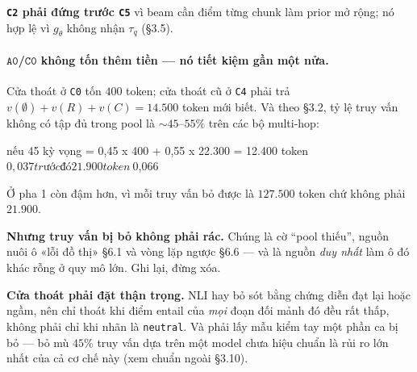 \documentclass[11pt,a4paper]{article}
\begin{document}

\textbf{\texttt{C2} phải đứng trước \texttt{C5}} vì beam cần điểm từng chunk làm prior mở
rộng; nó hợp lệ vì $g_\theta$ không nhận $\tau_q$ (\S3.5).

\paragraph{$\mathtt{A0}$/$\mathtt{C0}$ không tốn thêm tiền --- nó tiết kiệm gần một nửa.} Cửa
thoát ở \texttt{C0} tốn $400$ token; cửa thoát cũ ở \texttt{C4} phải trả
$v(\emptyset)+v(R)+v(C)=14.500$ token mới biết. Và theo \S3.2, tỷ lệ truy vấn không có tập đủ
trong pool là ${\sim}45$--$55\%$ trên các bộ multi-hop:

\begin{dia}
nếu 45%
   kỳ vọng  =  0,45 x 400  +  0,55 x 22.300   =   12.400 token  ~ $0,037
   trước đó                                       21.900 token  ~ $0,066
\end{dia}

Ở pha 1 còn đậm hơn, vì mỗi truy vấn bỏ được là $127.500$ token chứ không phải $21.900$.

\textbf{Nhưng truy vấn bị bỏ không phải rác.} Chúng là cờ ``pool thiếu'', nguồn nuôi ô «lỗi đồ
thị» \S6.1 và vòng lặp ngược \S6.6 --- và là nguồn \emph{duy nhất} làm ô đó khác rỗng ở quy mô
lớn. Ghi lại, đừng xóa.

\textbf{Cửa thoát phải đặt thận trọng.} NLI hay bỏ sót bằng chứng diễn đạt lại hoặc ngầm, nên
chỉ thoát khi điểm entail của \emph{mọi} đoạn đối mảnh đó đều rất thấp, không phải chỉ khi nhãn
là \texttt{neutral}. Và phải lấy mẫu kiểm tay một phần ca bị bỏ --- bỏ mù $45\%$ truy vấn dựa
trên một model chưa hiệu chuẩn là rủi ro lớn nhất của cả cơ chế này (xem chuẩn ngoài \S3.10).
\end{document}
